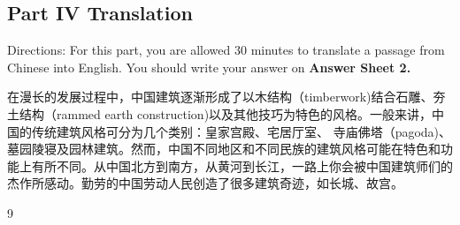 \documentclass[UTF8,11pt]{ctexart}
\begin{document}
\subsection*{\textbf{Part IV} \textbf{Translation}}


Directions: For this part, you are allowed 30 minutes to translate a passage from Chinese into English. You should write your answer on\textbf{ Answer Sheet 2.}


在漫长的发展过程中，中国建筑逐渐形成了以木结构（timberwork)结合石雕、夯土结构（rammed earth construction)以及其他技巧为特色的风格。一般来讲，中国的传统建筑风格可分为几个类别：皇家宫殿、宅居厅室、 寺庙佛塔（pagoda)、墓园陵寝及园林建筑。然而，中国不同地区和不同民族的建筑风格可能在特色和功能上有所不同。从中国北方到南方，从黄河到长江，一路上你会被中国建筑师们的杰作所感动。勤劳的中国劳动人民创造了很多建筑奇迹，如长城、故宫。


9
\end{document}
